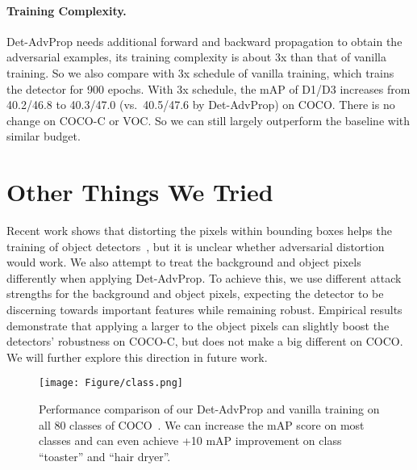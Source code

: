 \documentclass[final]{cvpr}
\begin{document}
\paragraph{Training Complexity.}
Det-AdvProp needs additional forward and backward propagation to obtain the adversarial examples, its training complexity is about 3x than that of vanilla training. So we also compare with 3x schedule of vanilla training, which trains the detector for 900 epochs. 
With 3x schedule, the mAP of D1/D3 increases from 40.2/46.8 to 40.3/47.0 (vs.\ 40.5/47.6 by Det-AdvProp) on COCO. 
There is no change on COCO-C or VOC.
So we can still largely outperform the baseline with similar budget.

\section{Other Things We Tried}
Recent work shows that distorting the pixels within bounding boxes helps the training of object detectors~\cite{zoph2019learning}, but it is unclear whether adversarial distortion would work.
We also attempt to treat the background and object pixels differently when applying Det-AdvProp.
To achieve this, we use different attack strengths for the background and object pixels, expecting the detector to be discerning towards important features while remaining robust.
Empirical results demonstrate that applying a larger  to the object pixels can slightly boost the detectors' robustness on COCO-C, but does not make a big different on COCO.
We will further explore this direction in future work.


\begin{figure*}[!htb]
\centering
\texttt{[image: Figure/class.png]}
\caption{Performance comparison of our Det-AdvProp and vanilla training on all 80 classes of COCO~\cite{lin2015coco}.
We can increase the mAP score on most classes and can even achieve +10 mAP improvement on class ``toaster'' and ``hair dryer''.}
\label{fig:class}
\end{figure*}
\end{document}
